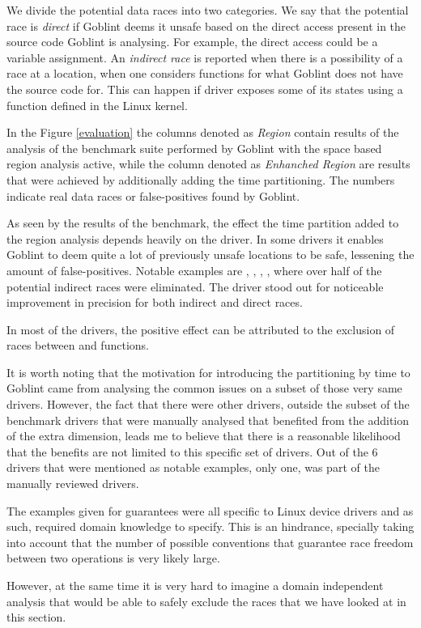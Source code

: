 \documentclass[..thesis.tex]{subfiles}
\begin{document}
We divide the potential data races into two categories. We say that the potential race is \textit{direct} if Goblint deems it unsafe based on the direct access present in the source code
Goblint is analysing. For example, the direct access could be a variable assignment.
An \textit{indirect race} is reported when there is a possibility of a race at a location, when one considers functions for what Goblint does not have the source code for.
This can happen if driver exposes some of its states using a function defined in the Linux kernel.   

In the Figure \ref{evaluation} the columns denoted as \textit{Region} contain results of the analysis of the benchmark suite performed by Goblint with the space based region analysis active,
while the column denoted as \textit{Enhanched Region} are results that were achieved by additionally adding the time partitioning.
The numbers indicate real data races or false-positives found by Goblint.

As seen by the results of the benchmark, the effect the time partition added to the region analysis depends heavily on the driver.
In some drivers it enables Goblint to deem quite a lot of previously unsafe locations to be safe, lessening the amount of false-positives.
Notable examples are , , , ,
where over half of the potential indirect races were eliminated. The driver  stood out for noticeable improvement in precision for both indirect and direct races.

In most of the drivers, the positive effect can be attributed to the exclusion of races between  and  functions. 

It is worth noting that the motivation for introducing the partitioning by time to Goblint came from analysing the common issues on a subset of those very same drivers.
However, the fact that there were other drivers, outside the subset of the benchmark drivers that were manually analysed
that benefited from the addition of the extra dimension, leads me to believe that there is a reasonable likelihood
that the benefits are not limited to this specific set of drivers. Out of the 6 drivers that were mentioned as notable examples, only one,
 was part of the manually reviewed drivers.



The examples given for guarantees were all specific to Linux device drivers and as such, required domain knowledge to specify. This is an hindrance,
specially taking into account that the number of possible conventions that guarantee race freedom between two operations is very likely large.  

However, at the same time it is very hard to imagine a domain independent analysis that would be able to safely exclude the races that we have looked at in this section.

\end{document}
